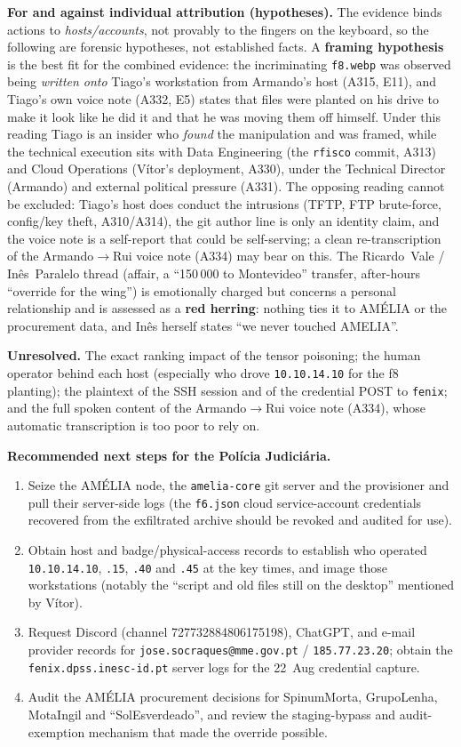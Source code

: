 \documentclass[11pt,a4paper,final,oneside]{article}
\begin{document}
\textbf{For and against individual attribution (hypotheses).} The evidence binds
actions to \emph{hosts/accounts}, not provably to the fingers on the keyboard, so
the following are forensic hypotheses, not established facts. A \textbf{framing
hypothesis} is the best fit for the combined evidence: the incriminating
\texttt{f8.webp} was observed being \emph{written onto} Tiago's workstation from
Armando's host (A315, E11), and Tiago's own voice note (A332, E5) states that
files were planted on his drive to make it look like he did it and that he was
moving them off himself. Under this reading Tiago is an insider who \emph{found}
the manipulation and was framed, while the technical execution sits with Data
Engineering (the \texttt{rfisco} commit, A313) and Cloud Operations (Vítor's
deployment, A330), under the Technical Director (Armando) and external political
pressure (A331). The opposing reading cannot be excluded: Tiago's host does
conduct the intrusions (TFTP, FTP brute-force, config/key theft, A310/A314), the
git author line is only an identity claim, and the voice note is a self-report
that could be self-serving; a clean re-transcription of the Armando$\rightarrow$Rui
voice note (A334) may bear on this. The Ricardo~Vale / Inês~Paralelo thread
(affair, a ``150\,000 to Montevideo'' transfer, after-hours ``override for the
wing'') is emotionally charged but concerns a personal relationship and is
assessed as a \textbf{red herring}: nothing ties it to AMÉLIA or the procurement
data, and Inês herself states ``we never touched AMELIA''.

\textbf{Unresolved.} The exact ranking impact of the tensor poisoning; the human
operator behind each host (especially who drove \texttt{10.10.14.10} for the f8
planting); the plaintext of the SSH session and of the credential POST to
\texttt{fenix}; and the full spoken content of the Armando$\rightarrow$Rui voice
note (A334), whose automatic transcription is too poor to rely on.

\textbf{Recommended next steps for the Polícia Judiciária.}
\begin{enumerate}
  \item Seize the AMÉLIA node, the \texttt{amelia-core} git server and the
  provisioner and pull their server-side logs (the \texttt{f6.json} cloud
  service-account credentials recovered from the exfiltrated archive should be
  revoked and audited for use).
  \item Obtain host and badge/physical-access records to establish who operated
  \texttt{10.10.14.10}, \texttt{.15}, \texttt{.40} and \texttt{.45} at the key
  times, and image those workstations (notably the ``script and old files still
  on the desktop'' mentioned by Vítor).
  \item Request Discord (channel 727732884806175198), ChatGPT, and e-mail
  provider records for \texttt{jose.socraques@mme.gov.pt} /
  \texttt{185.77.23.20}; obtain the \texttt{fenix.dpss.inesc-id.pt} server logs
  for the 22~Aug credential capture.
  \item Audit the AMÉLIA procurement decisions for SpinumMorta, GrupoLenha,
  MotaIngil and ``SolEsverdeado'', and review the staging-bypass and
  audit-exemption mechanism that made the override possible.
\end{enumerate}
\end{document}
